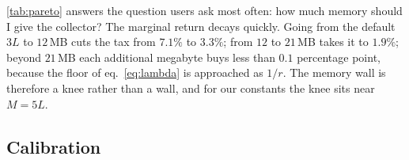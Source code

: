 \begin{table}[t]
\centering
\small
{}
\caption{Pareto front of tax against memory, from eqs.~\ref{eq:lambda}--\ref{eq:memlaw} at
$L = 2.333$\,MB, $a = 0.335$\,GB/s and $b = 256$; ``typ.'' uses the measured $\kappa_M = 0.772$,
``cons.'' the conservative $\kappa_M = 1$ that the contract assumes. Regenerated by
\texttt{figures/gen\_roofline.py}.}
\label{tab:pareto}
\end{table}

\tab\ref{tab:pareto} answers the question users ask most often: how much memory should I give the
collector?
The marginal return decays quickly.
Going from the default $3L$ to $12$\,MB cuts the tax from $7.1\%$ to $3.3\%$; from $12$ to $21$\,MB
takes it to $1.9\%$; beyond $21$\,MB each additional megabyte buys less than $0.1$ percentage point,
because the floor of eq.~\ref{eq:lambda} is approached as $1/r$.
The memory wall is therefore a knee rather than a wall, and for our constants the knee sits near
$M = 5L$.

\subsection{Calibration}
\label{sec:roofline-calib}

